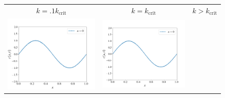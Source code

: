 \documentclass[12pt, reqno]{report}
\theoremstyle{definition}
\theoremstyle{remark}
\begin{document}
    
\begin{figure}[H]

    \def\acfdwidth{.25\paperwidth}

    \centering
    
    \begin{tabular}{ccc}
        $k=.1k_\text{crit}$ & $k=k_\text{crit}$ & $k>k_\text{crit}$ \\
        \includegraphics[width = \acfdwidth]{media_paper/very_stable_CH_CN_0.png} &
        \includegraphics[width = \acfdwidth]{media_paper/stable_CH_CN_0} &

\end{tabular}
\end{figure}
\end{document}
